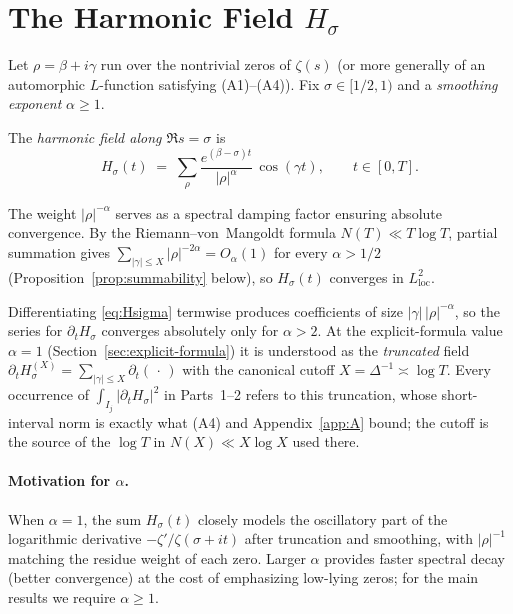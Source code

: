 \section{The Harmonic Field \texorpdfstring{$H_\sigma$}{H sigma}}\label{sec:harmonic-field}

Let $\rho=\beta+i\gamma$ run over the nontrivial zeros of $\zeta(s)$
(or more generally of an automorphic $L$-function satisfying (A1)--(A4)).
Fix $\sigma\in[1/2,1)$ and a \emph{smoothing exponent} $\alpha\ge 1$.

\begin{definition}\label{def:harmonic-field}
The \emph{harmonic field along $\Re s=\sigma$} is
\begin{equation}
H_\sigma(t)
  \;=\;\sum_\rho \frac{e^{(\beta-\sigma)t}}{|\rho|^\alpha}\,\cos(\gamma t),
  \qquad t\in[0,T].
\label{eq:Hsigma}
\end{equation}
\end{definition}

The weight $|\rho|^{-\alpha}$ serves as a spectral damping factor ensuring absolute
convergence.
By the Riemann--von~Mangoldt formula $N(T)\ll T\log T$,
partial summation gives $\sum_{|\gamma|\le X}|\rho|^{-2\alpha}=O_\alpha(1)$
for every $\alpha>1/2$ (Proposition~\ref{prop:summability} below),
so $H_\sigma(t)$ converges in $L^2_{\mathrm{loc}}$.

\begin{remark}\label{rmk:truncation}
Differentiating \eqref{eq:Hsigma} termwise produces coefficients of size
$|\gamma|\,|\rho|^{-\alpha}$, so the series for $\partial_t H_\sigma$ converges
absolutely only for $\alpha>2$.  At the explicit-formula value $\alpha=1$
(Section~\ref{sec:explicit-formula}) it is understood as the \emph{truncated}
field $\partial_t H_\sigma^{(X)}=\sum_{|\gamma|\le X}\partial_t(\,\cdot\,)$ with
the canonical cutoff $X=\Delta^{-1}\asymp\log T$.  Every occurrence of
$\int_{I_j}|\partial_t H_\sigma|^2$ in Parts~1–2 refers to this truncation,
whose short-interval norm is exactly what (A4) and Appendix~\ref{app:A} bound;
the cutoff is the source of the $\log T$ in $N(X)\ll X\log X$ used there.
\end{remark}

\paragraph{Motivation for $\alpha$.}
When $\alpha=1$, the sum $H_\sigma(t)$ closely models the oscillatory part of the
logarithmic derivative $-\zeta'/\zeta(\sigma+it)$ after truncation and smoothing,
with $|\rho|^{-1}$ matching the residue weight of each zero.
Larger $\alpha$ provides faster spectral decay (better convergence) at the cost of
emphasizing low-lying zeros; for the main results we require $\alpha\ge 1$.

